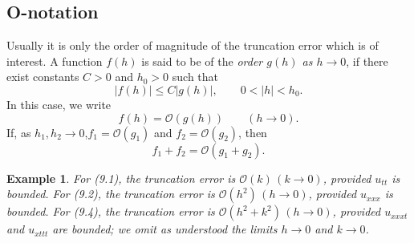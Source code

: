 \documentclass[11pt]{book}
\theoremstyle{example}
\newtheorem{example}{Example}[chapter]
\theoremstyle{problem}
\theoremstyle{theorem}
\theoremstyle{definition}
\begin{document}
\subsection{O-notation}
Usually it is only the order of magnitude of the truncation error which is of interest. A function $f(h)$ is said to be of the \emph{order $g(h)$ as $h\rightarrow0$}, if there exist constants $C>0$ and $h_0>0$ such that
\begin{equation*}
	|f(h)|{\leq}C|g(h)|,\qquad0<|h|<h_0\mathrm{.}
\end{equation*}
In this case, we write
\begin{equation*}
	f(h)=\mathcal{O}(g(h))\qquad(h\rightarrow0)\mathrm{.}
\end{equation*}
If, as $h_1,h_2\rightarrow0$,$f_1=\mathcal{O}(g_1)$ and $f_2=\mathcal{O}(g_2)$, then
\begin{equation*}
	f_1+f_2=\mathcal{O}(g_1+g_2)\mathrm{.}
\end{equation*}
\begin{example}
	For (9.1), the truncation error is $\mathcal{O}(k)\,(k\rightarrow0)$, provided $u_{tt}$ is bounded. For (9.2), the truncation error is $\mathcal{O}(h^2)\,(h\rightarrow0)$, provided $u_{xxx}$ is bounded. For (9.4), the truncation error is $\mathcal{O}(h^2+k^2)\,(h\rightarrow0)$, provided $u_{xxxt}$ and $u_{xttt}$ are bounded; we omit as understood the limits $h\rightarrow0$ and $k\rightarrow0$.
\end{example}
\end{document}
